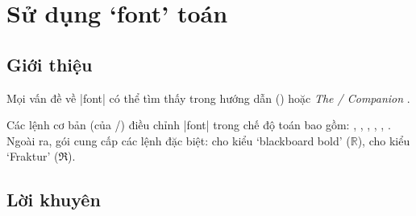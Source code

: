 \documentclass[11pt,leqno,titlepage,openany,oneside]{amsldoc}[1999/12/13]
\newcommand{\booktitle}[1]{\textit{#1}}
\begin{document}
\chapter{Sử dụng `font' toán}

\section{Giới thiệu}

Mọi vấn đề về |font| có thể tìm thấy trong hướng dẫn ()
hoặc \booktitle{The \latex/ Companion} \cite{tlc}.

\medskip
Các lệnh cơ bản (của \latex/)
điều chỉnh |font| trong chế độ toán bao gồm:
, , , , , .
Ngoài ra, gói  cung cấp các lệnh đặc biệt:
 cho kiểu `blackboard bold' ($\mathbb R$),
 cho kiểu `Fraktur' ($\mathfrak R$).

\section{Lời khuyên}
\end{document}
